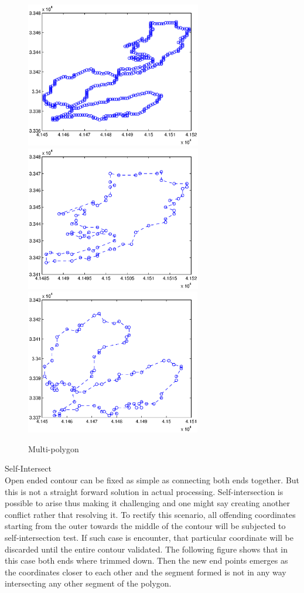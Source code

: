 \documentclass{sig-alternate}
\begin{document}
\begin{figure}
 \includegraphics[height=2.5in]{split0.eps}
 \includegraphics[height=2.5in]{split1.eps}
 \includegraphics[height=2.5in]{split2.eps}
 \caption{Multi-polygon}

 \label{fig:Multi-polygon}
\end{figure}

Self-Intersect\\

Open ended contour can be fixed as simple as connecting both ends together. But this is not a  straight forward solution in actual processing. Self-intersection is possible to arise thus making it challenging and one might say creating another conflict rather that resolving it. 
To rectify this scenario, all offending coordinates starting from the outer towards the middle of the contour will be subjected to self-intersection test. If such case is encounter, that particular coordinate will be discarded until the entire contour validated.
The following figure shows that in this case both ends where trimmed down. Then the new end points emerges as the coordinates closer to each other and the segment formed is not in any way intersecting any other segment of the polygon.
\end{document}
